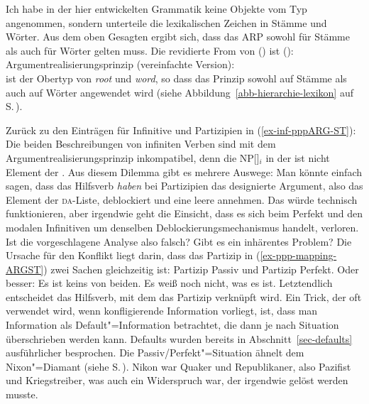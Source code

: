 {Ich habe in der hier entwickelten Grammatik keine Objekte vom Typ  angenommen, sondern
unterteile die lexikalischen Zeichen in Stämme und Wörter. Aus dem oben Gesagten ergibt sich, dass
das ARP sowohl für Stämme als auch für Wörter gelten muss. Die revidierte From von () ist
():
\ea
\label{Prinzip-Argumentrealisierung-einfach-SUBJ-lexical-sign}%
Argumentrealisierungsprinzip (vereinfachte Version):\\
 \impl
{}
\z
\largerpage
{} ist der Obertyp von \emph{root} und \emph{word}, so dass das Prinzip sowohl auf
Stämme als auch auf Wörter angewendet wird (siehe Abbildung~\ref{abb-hierarchie-lexikon} auf S.\,\pageref{abb-hierarchie-lexikon}).

Zurück zu den Einträgen für Infinitive und Partizipien in (\ref{ex-inf-pppARG-ST}): 
Die beiden Beschreibungen von infiniten Verben sind mit dem Argumentrealisierungsprinzip
inkompatibel, denn die NP[\str]$_i$ in der \subjl ist nicht Element 
der \argstl. Aus diesem Dilemma gibt es mehrere Auswege: Man könnte einfach sagen, dass das
Hilfsverb \emph{haben} bei Partizipien das designierte Argument, also das Element der \textsc{da}-Liste, deblockiert
und eine leere \subjl annehmen. Das würde technisch funktionieren, aber irgendwie geht die Einsicht,
dass es sich beim Perfekt und den modalen Infinitiven um denselben Deblockierungsmechanismus handelt, verloren. Ist die vorgeschlagene
Analyse also falsch? Gibt es ein inhärentes Problem? Die Ursache für den Konflikt liegt darin, dass
das Partizip in (\ref{ex-ppp-mapping-ARGST}) zwei Sachen gleichzeitig ist: Partizip Passiv und
Partizip Perfekt. Oder besser: Es ist keins von beiden. Es weiß noch nicht, was es ist. Letztendlich
entscheidet das Hilfsverb, mit dem das Partizip verknüpft wird.
Ein Trick, der oft verwendet wird, wenn konfligierende Information vorliegt, ist, dass man Information als
Default"=Information betrachtet, die dann je nach Situation überschrieben werden kann. Defaults
wurden bereits in Abschnitt~\ref{sec-defaults} ausführlicher besprochen. Die Passiv/Perfekt"=Situation
ähnelt dem Nixon"=Diamant (siehe S.\,\pageref{abb-nixon}). Nikon war Quaker und Republikaner, also
Pazifist und Kriegstreiber, was auch ein Widerspruch war, der irgendwie gelöst werden musste.

}
